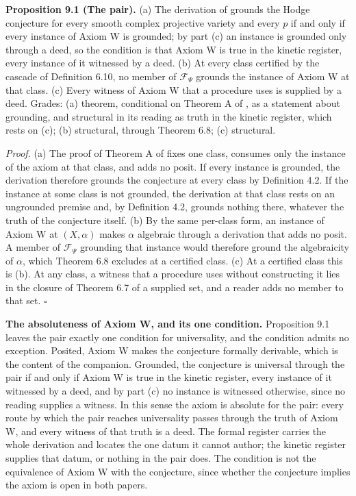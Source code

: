 \documentclass[10pt,twocolumn]{article}
\begin{document}
\textbf{Proposition 9.1 (The pair).} (a) The derivation of
\cite{islam2026w} grounds the Hodge conjecture for every smooth complex
projective variety and every \(p\) if and only if every instance of
Axiom W is grounded; by part (c) an instance is grounded only through a
deed, so the condition is that Axiom W is true in the kinetic register,
every instance of it witnessed by a deed. (b) At every class certified
by the cascade of Definition 6.10, no member of \(\mathcal{F}_\Psi\)
grounds the instance of Axiom W at that class. (c) Every witness of
Axiom W that a procedure uses is supplied by a deed. Grades: (a)
theorem, conditional on Theorem A of \cite{islam2026w}, as a statement
about grounding, and structural in its reading as truth in the kinetic
register, which rests on (c); (b) structural, through Theorem 6.8; (c)
structural.

\emph{Proof.} (a) The proof of Theorem A of \cite{islam2026w} fixes one
class, consumes only the instance of the axiom at that class, and adds
no posit. If every instance is grounded, the derivation therefore
grounds the conjecture at every class by Definition 4.2. If the instance
at some class is not grounded, the derivation at that class rests on an
ungrounded premise and, by Definition 4.2, grounds nothing there,
whatever the truth of the conjecture itself. (b) By the same per-class
form, an instance of Axiom W at \((X,\alpha)\) makes \(\alpha\)
algebraic through a derivation that adds no posit. A member of
\(\mathcal{F}_\Psi\) grounding that instance would therefore ground the
algebraicity of \(\alpha\), which Theorem 6.8 excludes at a certified
class. (c) At a certified class this is (b). At any class, a witness
that a procedure uses without constructing it lies in the closure of
Theorem 6.7 of a supplied set, and a reader adds no member to that set.
\(\square\)

\textbf{The absoluteness of Axiom W, and its one condition.} Proposition
9.1 leaves the pair exactly one condition for universality, and the
condition admits no exception. Posited, Axiom W makes the conjecture
formally derivable, which is the content of the companion. Grounded, the
conjecture is universal through the pair if and only if Axiom W is true
in the kinetic register, every instance of it witnessed by a deed, and
by part (c) no instance is witnessed otherwise, since no reading
supplies a witness. In this sense the axiom is absolute for the pair:
every route by which the pair reaches universality passes through the
truth of Axiom W, and every witness of that truth is a deed. The formal
register carries the whole derivation and locates the one datum it
cannot author; the kinetic register supplies that datum, or nothing in
the pair does. The condition is not the equivalence of Axiom W with the
conjecture, since whether the conjecture implies the axiom is open in
both papers.
\end{document}
